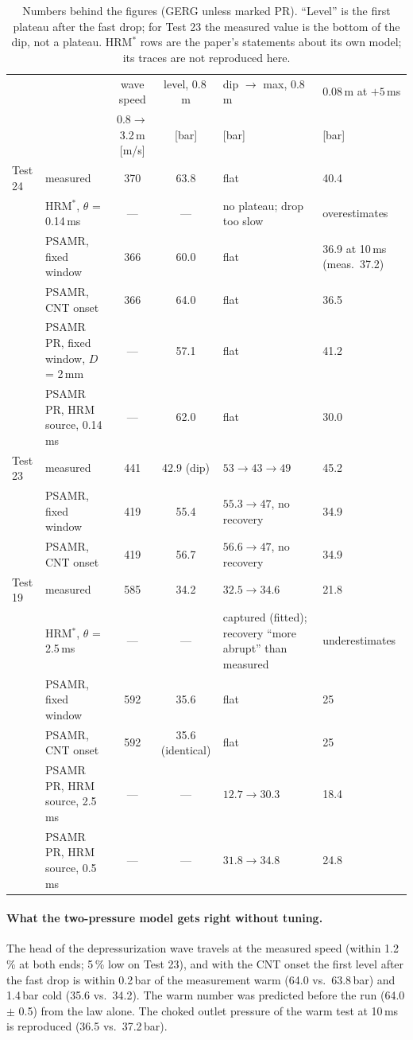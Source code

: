\documentclass[11pt,a4paper]{article}
\begin{document}
\begin{table}[htbp]\centering\scriptsize\setlength{\tabcolsep}{2.5pt}
\caption{Numbers behind the figures (GERG unless marked PR). ``Level'' is the first plateau after the fast drop; for Test 23 the measured value is the bottom of the dip, not a plateau. HRM$^*$ rows are the paper's statements about its own model; its traces are not reproduced here.}
\begin{tabular}{llccp{2.7cm}p{2.1cm}}\toprule
& & wave speed & level, 0.8\,m & dip $\to$ max, 0.8\,m & 0.08\,m at $+5$\,ms\\
& & 0.8$\to$3.2\,m [m/s] & [bar] & [bar] & [bar]\\\midrule
Test 24 & measured & 370 & 63.8 & flat & 40.4\\
& HRM$^*$, $\theta$ = 0.14\,ms & --- & --- & no plateau; drop too slow & overestimates\\
& PSAMR, fixed window & 366 & 60.0 & flat & 36.9 at 10\,ms (meas.\ 37.2)\\
& PSAMR, CNT onset & 366 & 64.0 & flat & 36.5\\
& PSAMR PR, fixed window, $D$ = 2\,mm & --- & 57.1 & flat & 41.2\\
& PSAMR PR, HRM source, 0.14\,ms & --- & 62.0 & flat & 30.0\\\midrule
Test 23 & measured & 441 & 42.9 (dip) & $53 \to 43 \to 49$ & 45.2\\
& PSAMR, fixed window & 419 & 55.4 & $55.3 \to 47$, no recovery & 34.9\\
& PSAMR, CNT onset & 419 & 56.7 & $56.6 \to 47$, no recovery & 34.9\\\midrule
Test 19 & measured & 585 & 34.2 & $32.5 \to 34.6$ & 21.8\\
& HRM$^*$, $\theta$ = 2.5\,ms & --- & --- & captured (fitted); recovery ``more abrupt'' than measured & underestimates\\
& PSAMR, fixed window & 592 & 35.6 & flat & 25\\
& PSAMR, CNT onset & 592 & 35.6 (identical) & flat & 25\\
& PSAMR PR, HRM source, 2.5\,ms & --- & --- & $12.7 \to 30.3$ & 18.4\\
& PSAMR PR, HRM source, 0.5\,ms & --- & --- & $31.8 \to 34.8$ & 24.8\\\bottomrule
\end{tabular}\end{table}

\paragraph{What the two-pressure model gets right without tuning.} The head of the depressurization wave travels at the measured speed (within 1.2\,\% at both ends; 5\,\% low on Test 23), and with the CNT onset the first level after the fast drop is within 0.2\,bar of the measurement warm (64.0 vs.\ 63.8\,bar) and 1.4\,bar cold (35.6 vs.\ 34.2). The warm number was predicted before the run (64.0 $\pm$ 0.5) from the law alone. The choked outlet pressure of the warm test at 10\,ms is reproduced (36.5 vs.\ 37.2\,bar).
\end{document}
